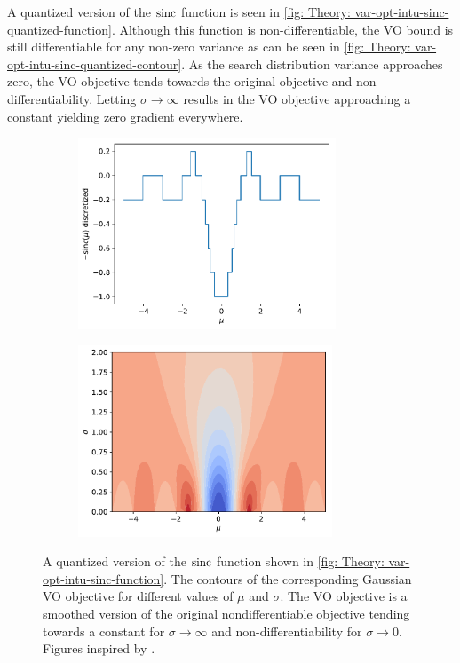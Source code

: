 A quantized version of the ${\text{sinc}}$ function is seen in \autoref{fig: Theory: var-opt-intu-sinc-quantized-function}. Although this function is non-differentiable, the \gls{VO} bound is still differentiable for any non-zero variance as can be seen in \autoref{fig: Theory: var-opt-intu-sinc-quantized-contour}. As the search distribution variance approaches zero, the \gls{VO} objective tends towards the original objective and non-differentiability. Letting $\sigma\rightarrow\infty$ results in the \gls{VO} objective approaching a constant yielding zero gradient everywhere.
\begin{figure}[tbp!]
    \begin{subfigure}[b]{0.49\textwidth}
        \centering
        \includegraphics[height=5.7cm]{graphics/var-opt-intu/variational-optimization-function-sinc_quantized.pdf}
        \caption{}
        \label{fig: Theory: var-opt-intu-sinc-quantized-function}
    \end{subfigure}
    \hfill
    \begin{subfigure}[b]{0.49\textwidth}
        \centering
        \includegraphics[height=5.7cm]{graphics/var-opt-intu/variational-optimization-contour-sinc_quantized.pdf}
        \caption{}
        \label{fig: Theory: var-opt-intu-sinc-quantized-contour}
    \end{subfigure}
    \caption{ A quantized version of the ${\text{sinc}}$ function shown in \autoref{fig: Theory: var-opt-intu-sinc-function}.  The contours of the corresponding Gaussian \gls{VO} objective for different values of $\mu$ and $\sigma$. The \gls{VO} objective is a smoothed version of the original nondifferentiable objective tending towards a constant for $\sigma\rightarrow\infty$ and non-differentiability for $\sigma\rightarrow0$. Figures inspired by \cite{Huszar2017}.}
    \label{fig: Theory: var-opt-intu-sinc-quantized}
\end{figure}


